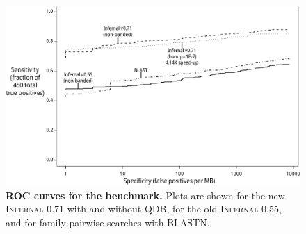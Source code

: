 \begin{figure}
\begin{center}
\includegraphics[width=6.4in,angle=0]{figs/d2roc_ai}
\end{center}
\caption{\textbf{ROC curves for the benchmark.}  Plots are shown for
the new \textsc{Infernal} 0.71 with and without QDB, for the old
\textsc{Infernal 0.55}, and for family-pairwise-searches with BLASTN.
}
\label{fig:roc}
\end{figure}
